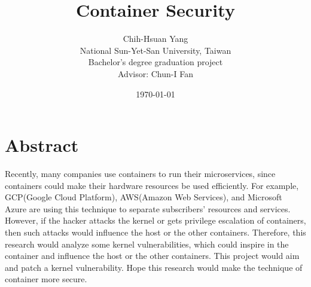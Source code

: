 \documentclass[12pt,a4paper,oneside,draft]{IEEEconf}
\title{{\mytitle Container Security}}
\author{Chih-Hsuan Yang\\

National Sun-Yet-San University, Taiwan \\
Bachelor's degree graduation project \\

Advisor: Chun-I Fan
}
\date{\today}
\begin{document}
\maketitle


\section{Abstract}
Recently, many companies use containers to run their microservices, since containers could
make their hardware resources be used efficiently. For example, GCP(Google Cloud Platform),
AWS(Amazon Web Services), and Microsoft Azure are using this technique to separate subscribers'
resources and services. However, if the hacker attacks the kernel or gets privilege
escalation of containers, then such attacks would influence the host or the other containers.
Therefore, this research would analyze some kernel vulnerabilities, which could inspire in
the container and influence the host or the other containers. This project would aim and patch
a kernel vulnerability. Hope this research would make the technique of container more secure.
\end{document}
